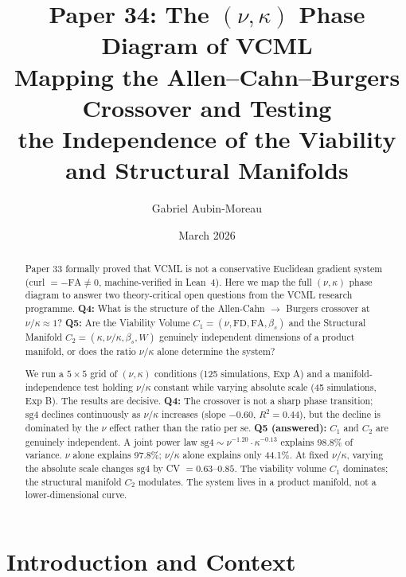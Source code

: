 \documentclass[11pt]{article}
\title{\textbf{Paper 34: The $(\nu, \kappa)$ Phase Diagram of VCML}\\
\large Mapping the Allen--Cahn--Burgers Crossover and Testing\\
the Independence of the Viability and Structural Manifolds}
\author{Gabriel Aubin-Moreau}
\date{March 2026}
\begin{document}
\maketitle

\begin{abstract}
Paper 33 formally proved that VCML is not a conservative Euclidean gradient system
(curl $= -\mathrm{FA} \neq 0$, machine-verified in Lean~4). Here we map the full
$(\nu, \kappa)$ phase diagram to answer two theory-critical open questions from the
VCML research programme.
\textbf{Q4:} What is the structure of the Allen-Cahn $\to$ Burgers crossover at
$\nu/\kappa \approx 1$?
\textbf{Q5:} Are the Viability Volume $C_1 = (\nu, \mathrm{FD}, \mathrm{FA}, \beta_s)$
and the Structural Manifold $C_2 = (\kappa, \nu/\kappa, \beta_s, W)$ genuinely independent
dimensions of a product manifold, or does the ratio $\nu/\kappa$ alone determine the system?

We run a $5 \times 5$ grid of $(\nu, \kappa)$ conditions (125 simulations, Exp A) and a
manifold-independence test holding $\nu/\kappa$ constant while varying absolute scale
(45 simulations, Exp B). The results are decisive. \textbf{Q4:} The crossover is not a
sharp phase transition; $\mathrm{sg4}$ declines continuously as $\nu/\kappa$ increases
(slope $-0.60$, $R^2 = 0.44$), but the decline is dominated by the $\nu$ effect rather
than the ratio per se. \textbf{Q5 (answered):} $C_1$ and $C_2$ are genuinely independent.
A joint power law $\mathrm{sg4} \sim \nu^{-1.20} \cdot \kappa^{-0.13}$ explains 98.8\%
of variance. $\nu$ alone explains 97.8\%; $\nu/\kappa$ alone explains only 44.1\%.
At fixed $\nu/\kappa$, varying the absolute scale changes $\mathrm{sg4}$ by CV $= 0.63$--$0.85$.
The viability volume $C_1$ dominates; the structural manifold $C_2$ modulates.
The system lives in a product manifold, not a lower-dimensional curve.
\end{abstract}

\section{Introduction and Context}
\end{document}
